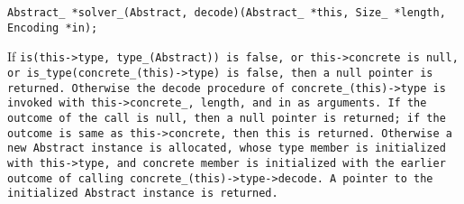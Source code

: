 
\tt{Abstract_ *solver_(Abstract, decode)(Abstract_ *this, Size_ *length, Encoding *in);}


\noindent If \tt{is(this->type, type_(Abstract))} is \tt{false}, or
\tt{this->concrete} is null, or \tt{is_type(concrete_(this)->type)}
is \tt{false}, then a null pointer is returned.
Otherwise the \tt{decode} procedure of \tt{concrete_(this)->type} is
invoked with \tt{this->concrete_}, \tt{length}, and \tt{in} as arguments.
If the outcome of the call is null, then a null pointer is returned;
if the outcome is same as \tt{this->concrete}, then \tt{this} is returned.
Otherwise a new \tt{Abstract} instance is allocated, whose \tt{type} member
is initialized with \tt{this->type}, and \tt{concrete} member is initialized
with the earlier outcome of calling \tt{concrete_(this)->type->decode}.
A pointer to the initialized \tt{Abstract} instance is returned.
